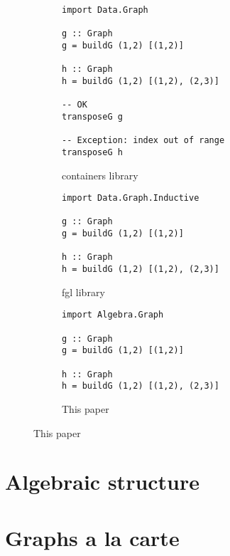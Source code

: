 \documentclass[acmlarge,anonymous]{acmart}\settopmatter{printfolios=true}
\begin{document}
\begin{figure}
\begin{subfigure}[b]{0.33\linewidth}
\begin{verbatim}
import Data.Graph

g :: Graph
g = buildG (1,2) [(1,2)]

h :: Graph
h = buildG (1,2) [(1,2), (2,3)]

-- OK
transposeG g

-- Exception: index out of range
transposeG h
\end{verbatim}
\caption{containers library}
\end{subfigure}
\hfill
\begin{subfigure}[b]{0.33\linewidth}
\begin{verbatim}
import Data.Graph.Inductive

g :: Graph
g = buildG (1,2) [(1,2)]

h :: Graph
h = buildG (1,2) [(1,2), (2,3)]
\end{verbatim}
\caption{fgl library}
\end{subfigure}
\hfill
\begin{subfigure}[b]{0.33\linewidth}
\begin{verbatim}
import Algebra.Graph

g :: Graph
g = buildG (1,2) [(1,2)]

h :: Graph
h = buildG (1,2) [(1,2), (2,3)]
\end{verbatim}
\caption{This paper}
\end{subfigure}

\end{figure}






\section{Algebraic structure\label{sec-algebra}}

\section{Graphs a la carte\label{sec-a-la-carte}}
\end{document}

